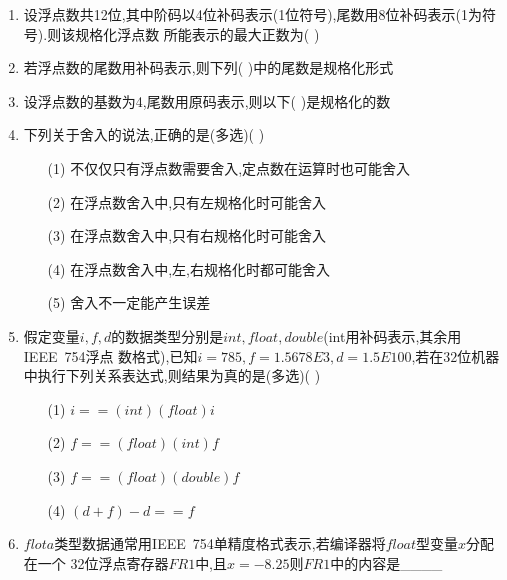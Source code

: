 \documentclass[12pt, a4paper, oneside, UTF8]{ctexbook}
\begin{document}
\begin{enumerate}
    \item 设浮点数共12位,其中阶码以4位补码表示(1位符号),尾数用8位补码表示(1为符号).则该规格化浮点数
    所能表示的最大正数为(    ) 

    \item 若浮点数的尾数用补码表示,则下列(   )中的尾数是规格化形式 
    \begin{choices}
    \end{choices}
    

    \item 设浮点数的基数为4,尾数用原码表示,则以下(   )是规格化的数 
    \begin{choices}
    \end{choices}
    

    \item 下列关于舍入的说法,正确的是(多选)(   )
    \begin{enumerate}
        \item [(1)] 不仅仅只有浮点数需要舍入,定点数在运算时也可能舍入 
        \item [(2)] 在浮点数舍入中,只有左规格化时可能舍入
        \item [(3)] 在浮点数舍入中,只有右规格化时可能舍入
        \item [(4)] 在浮点数舍入中,左,右规格化时都可能舍入
        \item [(5)] 舍入不一定能产生误差
    \end{enumerate}

    \item \bt 假定变量$i,f,d$的数据类型分别是$int,float,double$(int用补码表示,其余用IEEE\ 754浮点
    数格式),已知$i=785,f=1.5678E3,d=1.5E100$,若在$32$位机器中执行下列关系表达式,则结果为真的是(多选)(   )
    \begin{enumerate}
        \item [(1)] $i==(int)(float)i$ 
        \item [(2)] $f==(float)(int)f$ 
        \item [(3)] $f==(float)(double)f$
        \item [(4)] $(d+f)-d==f$
    \end{enumerate}

    \item \bt $flota$类型数据通常用IEEE\ 754单精度格式表示,若编译器将$float$型变量$x$分配在一个
    32位浮点寄存器$FR1$中,且$x=-8.25$则$FR1$中的内容是\_\_\_\_ 


\end{enumerate}
\end{document}
